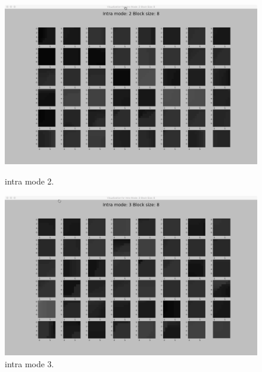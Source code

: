 \begin{figure}[H]
    \vspace*{1cm} %

    \begin{minipage}{0.49\textwidth}
        \includegraphics[width=\linewidth]{Figures/visu-size8x8/8-2.jpeg}
        \caption[Intra mode 2]{intra mode 2.}
        \label{fig:size8_mode2}
    \end{minipage}
    \hspace{\fill} %
    \begin{minipage}{0.49\textwidth}
        \includegraphics[width=\linewidth]{Figures/visu-size8x8/8-3}
        \caption[Intra mode 3]{intra mode 3.}
        \label{fig:size8_mode3}
    \end{minipage}
\end{figure}

